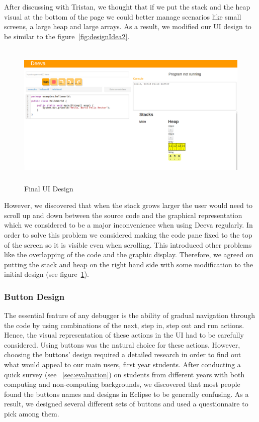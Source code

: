 \documentclass[11pt, a4paper]{article}
\begin{document}
After discussing with Tristan, we thought that if we put the stack and the heap visual at the bottom of the page we could better manage scenarios like small screens, a large heap and large arrays.
As a result, we modified our UI design to be similar to the figure~\ref{fig:designIdea2}.\\
\begin{figure}[h!]
\centering
\includegraphics[height=70mm,width=130mm]{finalDesign.png}
\caption{Final UI Design}
\label{fig:finalDesign}
\end{figure}

However, we discovered that when the stack grows larger the user would need to scroll up and down between the source code and the graphical representation which we considered to be a major inconvenience when using Deeva regularly.
In order to solve this problem we considered making the code pane fixed to the top of the screen so it is visible even when scrolling.
This introduced other problems like the overlapping of the code and the graphic display.
Therefore, we agreed on putting the stack and heap on the right hand side with some modification to the initial design (see figure~\ref{fig:finalDesign}).

\subsubsection{Button Design}
The essential feature of any debugger is the ability of gradual navigation through the code by using combinations of the next, step in, step out and run actions.
Hence, the visual representation of these actions in the UI had to be carefully considered.
Using buttons was the natural choice for these actions. However, choosing the buttons' design required a detailed research in order to find out what would appeal to our main users, first year students.
After conducting a quick survey (see ~\cref{sec:evaluation}) on students from different years with both computing and non-computing backgrounds, we discovered that most people found the buttons names and designs in Eclipse to be generally confusing.
As a result, we designed several different sets of buttons and used a questionnaire to pick among them.
\end{document}
